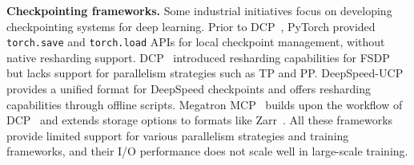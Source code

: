 
\noindent \textbf{Checkpointing frameworks.} %
Some industrial initiatives focus on developing checkpointing systems for deep learning. Prior to DCP~\cite{torch-dcp}, PyTorch provided \texttt{torch.save} and \texttt{torch.load} APIs for local checkpoint management, without native resharding support. DCP~\cite{torch-dcp} introduced resharding capabilities for FSDP but lacks support for %
parallelism strategies such as TP and PP. DeepSpeed-UCP~\cite{deepspeed-ucp} provides a unified format for DeepSpeed checkpoints and offers resharding capabilities through offline scripts. Megatron MCP~\cite{megatron-dcp} builds upon the workflow of DCP~\cite{torch-dcp} and extends storage options to formats like Zarr~\cite{Zarr}. %
All these frameworks provide limited support for various parallelism strategies and training frameworks, %
and their I/O performance does not scale well in large-scale training.  %

